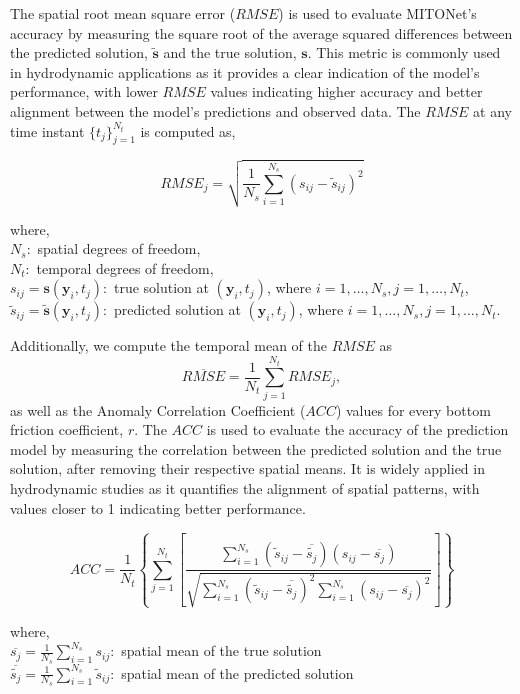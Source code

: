 \documentclass[draft]{agujournal2019}
\begin{document}
The spatial root mean square  error ($RMSE$) is used to evaluate MITONet's accuracy by measuring the square root of the average squared differences between the predicted solution, $\tilde{\mathbf{s}}$ and the true solution, $\mathbf{s}$. This metric is commonly used in hydrodynamic applications as it provides a clear indication of the model's performance, with lower $RMSE$ values indicating higher accuracy and better alignment between the model's predictions and observed data. The $RMSE$ at any time instant $\{t_j\}_{j=1}^{N_t}$ is computed as,

\begin{equation}
RMSE_j = \sqrt{\frac{1}{N_s} \sum_{i=1}^{N_s} (s_{ij} - \tilde{s}_{ij})^2}
\end{equation}

\noindent where, \\
\( N_s: \) spatial degrees of freedom, \\
\( N_t: \) temporal degrees of freedom, \\
\( s_{ij} = \mathbf{s}(\mathbf{y}_{i}, t_{j}): \) true solution at $(\mathbf{y}_{i}, t_j)$, where  $i = 1, \ldots, N_s, j = 1, \ldots, N_t$, \\
\( \tilde{s}_{ij} = \tilde{\mathbf{s}}(\mathbf{y}_{i}, t_{j}): \) predicted solution at $(\mathbf{y}_{i}, t_j)$, where  $i = 1, \ldots, N_s, j = 1, \ldots, N_t$.

\noindent Additionally, we compute the temporal mean of the $RMSE$ as 
\begin{equation}
    \overline{RMSE} = \frac{1}{N_t} \sum_{j=1}^{N_t} RMSE_{j},
\end{equation}
as well as the Anomaly Correlation Coefficient ($ACC$) values for every bottom friction coefficient, $r$. The $ACC$ is used to evaluate the accuracy of the prediction model by measuring the correlation between the predicted solution and the true solution, after removing their respective spatial means. It is widely applied in hydrodynamic studies as it quantifies the alignment of spatial patterns, with values closer to 1 indicating better performance.

\[
ACC = \frac{1}{N_t}\left\{ \sum_{j=1}^{N_t}\left[\frac{\sum_{i=1}^{N_s} (\tilde{s}_{ij} - \overline{\tilde{s_j}})(s_{ij} - \overline{s_j})}{\sqrt{\sum_{i=1}^{N_s} (\tilde{s}_{ij} - \overline{\tilde{s_j}})^2 \sum_{i=1}^{N_s} (s_{ij} - \overline{s_j})^2}} \right] \right\}
\]

\noindent where, \\
\(\overline{s_j}= \frac{1}{N_s} \sum_{i=1}^{N_s} s_{ij}:\) spatial mean of the true solution \\
\(\overline{\tilde{s_j}} = \frac{1}{N_s} \sum_{i=1}^{N_s} \tilde{s}_{ij}:\) spatial mean of the predicted solution
\end{document}
